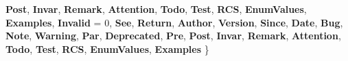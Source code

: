 \begin{DoxyCompactItemize}
{\bfseries Post}, 
{\bfseries Invar}, 
{\bfseries Remark}, 
\newline
{\bfseries Attention}, 
{\bfseries Todo}, 
{\bfseries Test}, 
{\bfseries R\+CS}, 
\newline
{\bfseries Enum\+Values}, 
{\bfseries Examples}, 
{\bfseries Invalid} = 0, 
{\bfseries See}, 
\newline
{\bfseries Return}, 
{\bfseries Author}, 
{\bfseries Version}, 
{\bfseries Since}, 
\newline
{\bfseries Date}, 
{\bfseries Bug}, 
{\bfseries Note}, 
{\bfseries Warning}, 
\newline
{\bfseries Par}, 
{\bfseries Deprecated}, 
{\bfseries Pre}, 
{\bfseries Post}, 
\newline
{\bfseries Invar}, 
{\bfseries Remark}, 
{\bfseries Attention}, 
{\bfseries Todo}, 
\newline
{\bfseries Test}, 
{\bfseries R\+CS}, 
{\bfseries Enum\+Values}, 
{\bfseries Examples}
 \}
\end{DoxyCompactItemize}
